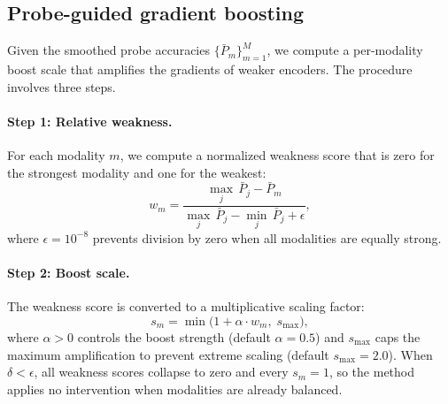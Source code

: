 \documentclass{article}
\begin{document}
\subsection{Probe-guided gradient boosting}
\label{sec:boost}

Given the smoothed probe accuracies $\{\bar{P}_m\}_{m=1}^{M}$, we compute a per-modality boost scale that amplifies the gradients of weaker encoders. The procedure involves three steps.

\paragraph{Step 1: Relative weakness.}
For each modality $m$, we compute a normalized weakness score that is zero for the strongest modality and one for the weakest:
%
\begin{equation}
\label{eq:weakness}
w_m = \frac{\max_j\,\bar{P}_j - \bar{P}_m}{\max_j\,\bar{P}_j - \min_j\,\bar{P}_j + \epsilon},
\end{equation}
%
where $\epsilon = 10^{-8}$ prevents division by zero when all modalities are equally strong.

\paragraph{Step 2: Boost scale.}
The weakness score is converted to a multiplicative scaling factor:
%
\begin{equation}
\label{eq:boost_scale}
s_m = \min\!\bigl(1 + \alpha \cdot w_m,\; s_{\max}\bigr),
\end{equation}
%
where $\alpha > 0$ controls the boost strength (default $\alpha{=}0.5$) and $s_{\max}$ caps the maximum amplification to prevent extreme scaling (default $s_{\max}{=}2.0$). When $\delta < \epsilon$, all weakness scores collapse to zero and every $s_m = 1$, so the method applies no intervention when modalities are already balanced.
\end{document}
